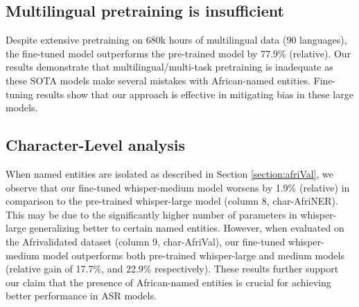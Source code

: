 \documentclass{INTERSPEECH2023}
\begin{document}
\subsection{Multilingual pretraining is insufficient}  
Despite extensive pretraining on 680k hours of multilingual data (90 languages), the fine-tuned model outperforms the pre-trained model by 77.9\% (relative). Our results demonstrate that multilingual/multi-task pretraining is inadequate as these SOTA models make several mistakes with African-named entities. Fine-tuning results show that our approach is effective in mitigating bias in these large models. 



\subsection{Character-Level analysis} 
When named entities are isolated as described in Section \ref{section:afriVal}, we observe that our fine-tuned whisper-medium model worsens by 1.9\% (relative) in comparison to the pre-trained whisper-large model (column 8, char-AfriNER). This may be due to the significantly higher number of parameters in whisper-large generalizing better to certain named entities.
However, when evaluated on the Afrivalidated dataset (column 9, char-AfriVal), our fine-tuned whisper-medium model outperforms both pre-trained whisper-large and medium models (relative gain of 17.7\%, and 22.9\% respectively). These results further support our claim that the presence of African-named entities is crucial for achieving better performance in ASR models. 
\end{document}
